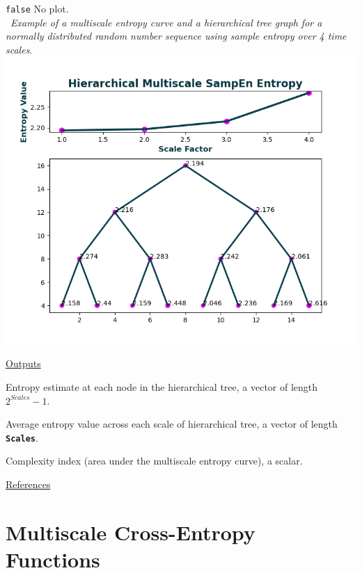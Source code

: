 \documentclass[12pt, a4paper, titlepage, openany]{book}
\begin{document}
\begin{description}[labelsep=1cm, labelwidth=2cm, nosep, style=multiline,leftmargin=3cm]
							\texttt{false}\hspace{12pt} No plot.\\ \ 
							\textit{Example of a multiscale entropy curve and a hierarchical tree graph for a normally distributed random number sequence using sample entropy over 4 time scales}.\\
							\includegraphics[scale=.65]{hMSEn1.png}
\end{description}

\noindent \ul{Outputs}
\begin{description}[labelsep=1cm, labelwidth=2cm, nosep, style=multiline,leftmargin=3cm]\footnotesize
\item[\texttt{MSx}]		Entropy estimate at each node in the hierarchical tree, a vector of length $2^{Scales}-1$.
\item[\texttt{Sn}]		Average entropy value across each scale of hierarchical tree, a vector of length \texttt{\textbf{Scales}}.
\item[\texttt{Ci}]		Complexity index (area under the multiscale entropy curve), a scalar.
\end{description}

\noindent \ul{References}\hspace{1cm}
\cite{hMS1} 




\newpage
\section{Multiscale Cross-Entropy Functions}
\vspace{3em}
\end{document}
